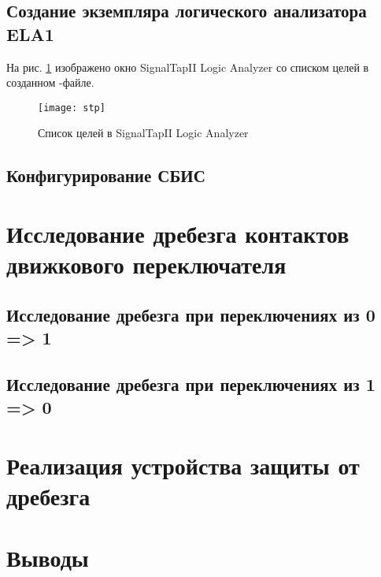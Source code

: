 \subsection{Создание экземпляра логического анализатора ELA1}

На рис. \ref{fig:stp_1} изображено окно SignalTapII Logic Analyzer со списком целей в созданном -файле.
\vspace{-0.5cm}
\begin{figure}[H]
	\begin{center}
		\texttt{[image: stp]}
		\caption{Список целей в SignalTapII Logic Analyzer}
		\label{fig:stp_1}
	\end{center}
\end{figure}

\subsection{Конфигурирование СБИС}

\section{Исследование дребезга контактов движкового переключателя}

\subsection{Исследование дребезга при переключениях из 0 => 1}

\subsection{Исследование дребезга при переключениях из 1 => 0}

\section{Реализация устройства защиты от дребезга}

\section{Выводы}

